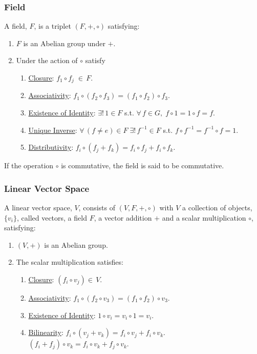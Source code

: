 \begin{frame}
  \frametitle{Field}
  \begin{definition}
    A \alert{field}, $F$, is a triplet $(F,+,\circ)$ satisfying:
    \begin{enumerate}[I]
    \item $F$ is an Abelian group under $+$.
    \item Under the action of $\circ$ satisfy
      \begin{enumerate}[i]
      \item \uline{Closure}: $f_1\circ f_j \;\in\,F$.
      \item \uline{Associativity}: $f_1\circ (f_2 \circ f_3) = (f_1\circ f_2) \circ f_3.$
      \item \uline{Existence of Identity}: $\exists!\, 1\in F$ s.t. $\forall\, f\in G,\; f\circ 1= 1\circ f = f$.
      \item \uline{Unique Inverse}: $\forall\, (f\neq e)\in F\; \exists!\, f^{-1}\in F$ s.t. $f\circ f^{-1} = f^{-1}\circ f = 1.$
      \item \uline{Distributivity}: $f_i\circ (f_j + f_k) = f_i\circ f_j + f_i\circ f_k.$
      \end{enumerate}
    \end{enumerate}
  \end{definition}

  If the operation $\circ$ is commutative, the field is said to be commutative.
\end{frame}

\begin{frame}
  \frametitle{Linear Vector Space}
  \begin{definition}
    A \alert{linear vector space}, $V$, consists of $(V,F,+,\circ)$ with $V$ a collection of objects, $\{v_i\}$, called vectors, a field $F$, a vector addition $+$ and a scalar multiplication $\circ$, satisfying:
    \begin{enumerate}[I]
    \item $(V,+)$ is an Abelian group.
    \item The scalar multiplication satisfies:
      \begin{enumerate}[i]
      \item \uline{Closure}: $(f_i\circ v_j)\in\, V$.
      \item \uline{Associativity}: $f_1\circ (f_2 \circ v_3) = (f_1\circ f_2) \circ v_3.$
      \item \uline{Existence of Identity}: $1\circ v_i = v_i \circ 1 = v_i$.
      \item \uline{Bilinearity}: $f_i\circ (v_j + v_k)=f_i\circ v_j + f_i\circ v_k$.\\
        $(f_i + f_j)\circ v_k = f_i\circ v_k + f_j\circ v_k.$
      \end{enumerate}
    \end{enumerate}
  \end{definition}
\end{frame}

